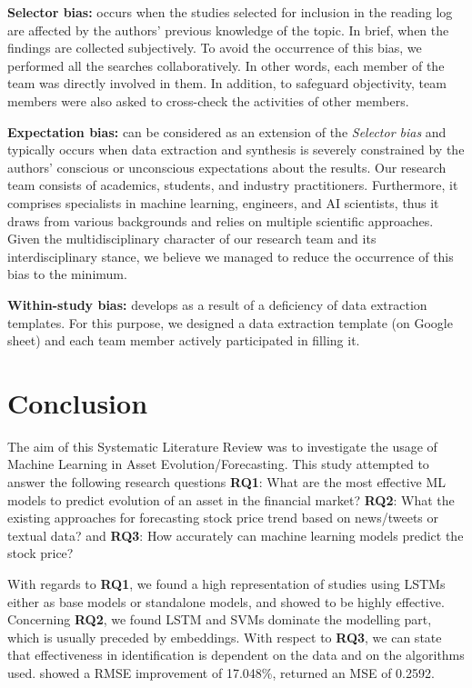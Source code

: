 \documentclass[11pt]{article}
\begin{document}
\textbf{Selector bias:} occurs when the studies selected for inclusion in the reading log are affected by the authors' previous knowledge of the topic. In brief, when the findings are collected subjectively. To avoid the occurrence of this bias, we performed all the searches collaboratively. In other words, each member of the team was directly involved in them. In addition, to safeguard objectivity, team members were also asked to cross-check the activities of other members. 

\textbf{Expectation bias:} can be considered as an extension of the \emph{Selector bias} and typically occurs when data extraction and synthesis is severely constrained by the authors' conscious or unconscious expectations about the results. Our research team consists of academics, students, and industry practitioners. Furthermore, it comprises specialists in machine learning, engineers, and AI scientists, thus it draws from various backgrounds and relies on multiple scientific approaches. Given the multidisciplinary character of our research team and its interdisciplinary stance, we believe we managed to reduce the occurrence of this bias to the minimum.

\textbf{Within-study bias:} develops as a result of a deficiency of data extraction templates. For this purpose, we designed a data extraction template (on Google sheet) and each team member actively participated in filling it.


\section{Conclusion}\label{S:conclusion}
The aim of this Systematic Literature Review was to investigate the usage of Machine Learning in Asset Evolution/Forecasting. This study attempted to answer the following research questions \textbf{RQ1}: What are the most effective ML models to predict evolution of an asset in the financial market? \textbf{RQ2}: What the existing approaches for forecasting stock price trend based on news/tweets or textual data? and \textbf{RQ3}: How accurately can machine learning models predict the stock price?

With regards to \textbf{RQ1}, we found a high representation of studies using LSTMs either as base models or standalone models, and showed to be highly effective. Concerning \textbf{RQ2}, we found LSTM and SVMs dominate the modelling part, which is usually preceded by embeddings. With respect to \textbf{RQ3}, we can state that effectiveness in identification is dependent on the data and on the algorithms used. \cite{shen2021} showed a RMSE improvement of 17.048\%, \cite{qiu2020} returned an MSE of 0.2592.
\end{document}
